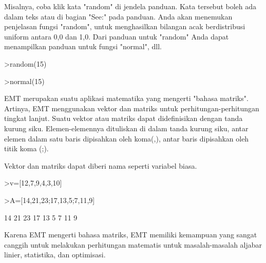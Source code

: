 \documentclass[a4paper,10pt]{article}
\begin{document}
\begin{eulernotebook}
\begin{eulercomment}
\begin{eulercomment}
\begin{eulercomment}
\begin{eulercomment}
\begin{eulercomment}
Misalnya, coba klik kata "random" di jendela panduan. Kata tersebut
boleh ada dalam teks atau di bagian "See:" pada panduan. Anda akan
menemukan penjelasan fungsi "random", untuk menghasilkan bilangan acak
berdistribusi uniform antara 0,0 dan 1,0. Dari panduan untuk "random"
Anda dapat menampilkan panduan untuk fungsi "normal", dll.
\end{eulercomment}
\begin{eulerprompt}
>random(15)
\end{eulerprompt}
\begin{euleroutput}
  [0.914541,  0.193585,  0.463387,  0.095153,  0.595017,  0.431184,
  0.72868,  0.465164,  0.323032,  0.525184,  0.502255,  0.168603,
  0.262253,  0.866587,  0.536137]
\end{euleroutput}
\begin{eulerprompt}
>normal(15)
\end{eulerprompt}
\begin{euleroutput}
  [-0.162777,  2.51983,  0.0714399,  0.20943,  0.796972,  -2.64436,
  -0.42224,  -0.403654,  -0.840341,  0.991361,  -0.309911,  -2.01066,
  -0.568246,  -1.0841,  -0.277172]
\end{euleroutput}
\begin{eulercomment}
EMT merupakan suatu aplikasi matematika yang mengerti "bahasa matriks". Artinya,
EMT menggunakan vektor dan matriks untuk perhitungan-perhitungan tingkat lanjut.
Suatu vektor atau matriks dapat didefinisikan dengan tanda kurung siku.
Elemen-elemennya dituliskan di dalam tanda kurung siku, antar elemen dalam satu
baris dipisahkan oleh koma(,), antar baris dipisahkan oleh titik koma (;).

Vektor dan matriks dapat diberi nama seperti variabel biasa.
\end{eulercomment}
\begin{eulerprompt}
>v=[12,7,9,4,3,10]
\end{eulerprompt}
\begin{euleroutput}
  [12,  7,  9,  4,  3,  10]
\end{euleroutput}
\begin{eulerprompt}
>A=[14,21,23;17,13,5;7,11,9]
\end{eulerprompt}
\begin{euleroutput}
             14            21            23 
             17            13             5 
              7            11             9 
\end{euleroutput}
\begin{eulercomment}
Karena EMT mengerti bahasa matriks, EMT memiliki kemampuan yang sangat canggih
untuk melakukan perhitungan matematis untuk masalah-masalah aljabar linier,
statistika, dan optimisasi.


\end{eulercomment}
\end{eulercomment}
\end{eulercomment}
\end{eulercomment}
\end{eulercomment}
\end{eulernotebook}
\end{document}
